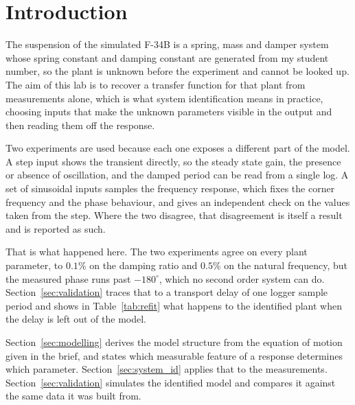 \section{Introduction}\label{sec:intro}

The suspension of the simulated F-34B is a spring, mass and damper system whose spring
constant and damping constant are generated from my student number, so the plant is
unknown before the experiment and cannot be looked up. The aim of this lab is to recover a
transfer function for that plant from measurements alone, which is what system
identification means in practice, choosing inputs that make the unknown parameters visible
in the output and then reading them off the response.

Two experiments are used because each one exposes a different part of the model. A step
input shows the transient directly, so the steady state gain, the presence or absence of
oscillation, and the damped period can be read from a single log. A set of sinusoidal
inputs samples the frequency response, which fixes the corner frequency and the phase
behaviour, and gives an independent check on the values taken from the step. Where the two
disagree, that disagreement is itself a result and is reported as such.

That is what happened here. The two experiments agree on every plant parameter, to $0.1$\%
on the damping ratio and $0.5$\% on the natural frequency, but the measured phase runs
past $-180^\circ$, which no second order system can do. Section~\ref{sec:validation} traces
that to a transport delay of one logger sample period and shows in Table~\ref{tab:refit}
what happens to the identified plant when the delay is left out of the model.

Section~\ref{sec:modelling} derives the model structure from the equation of motion given
in the brief, and states which measurable feature of a response determines which parameter.
Section~\ref{sec:system_id} applies that to the measurements. Section~\ref{sec:validation}
simulates the identified model and compares it against the same data it was built from.
